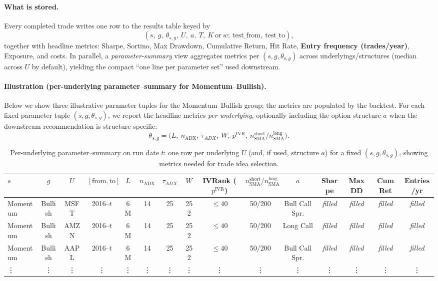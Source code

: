 \documentclass[12pt,a4paper]{report}
\begin{document}
\paragraph{What is stored.}
Every completed trade writes one row to the results table keyed by
\[
(s,\ g,\ \theta_{s,g},\ U,\ a,\ T,\ K\ \text{or}\ w;\ \text{test\_from},\ \text{test\_to}),
\]
together with headline metrics: Sharpe, Sortino, Max Drawdown, Cumulative Return, Hit Rate, \textbf{Entry frequency (trades/year)}, Exposure, and costs. In parallel, a \emph{parameter-summary} view aggregates metrics per $(s,g,\theta_{s,g})$ across underlyings/structures (median across $U$ by default), yielding the compact “one line per parameter set” used downstream.

\paragraph{Illustration (per-underlying parameter–summary for Momentum–Bullish).}
Below we show three illustrative parameter tuples for the Momentum–Bullish group; the metrics are populated by the backtest. For each fixed parameter tuple $(s,g,\theta_{s,g})$, we report the headline metrics \emph{per underlying}, optionally including the option structure $a$ when the downstream recommendation is structure-specific:
\[
\theta_{s,g}=\big(L,\ n_{\mathrm{ADX}},\ \tau_{\!ADX},\ W,\ p^{\text{IVR}},\ n_{\text{SMA}}^{\text{short}}/n_{\text{SMA}}^{\text{long}}\big).
\]

\begin{table}[h]
\centering
\begin{tabular}{lcccccccccccccc}
\toprule
$s$ & $g$ & $U$ & $[\text{from},\text{to}]$ & $L$ & $n_{\mathrm{ADX}}$ & $\tau_{\!ADX}$ & $W$ & IVRank ($p^{\text{IVR}}$) & $n_{\text{SMA}}^{\text{short}}/n_{\text{SMA}}^{\text{long}}$ & $a$ & Sharpe & MaxDD & CumRet & \textbf{Entries/yr} \\
\midrule
Momentum & Bullish & MSFT & 2016--$t$ & 6M  & 14 & 25 & 252 & $\le 40$ & 50/200 & Bull Call Spr. & \emph{filled} & \emph{filled} & \emph{filled} & \emph{filled} \\
Momentum & Bullish & AMZN & 2016--$t$ & 6M  & 14 & 25 & 252 & $\le 40$ & 50/200 & Long Call      & \emph{filled} & \emph{filled} & \emph{filled} & \emph{filled} \\
Momentum & Bullish & AAPL & 2016--$t$ & 6M  & 14 & 25 & 252 & $\le 40$ & 50/200 & Bull Call Spr. & \emph{filled} & \emph{filled} & \emph{filled} & \emph{filled} \\
\vdots    & \vdots  & \vdots & \vdots  & \vdots & \vdots & \vdots & \vdots & \vdots & \vdots & \vdots & \vdots & \vdots & \vdots & \vdots \\
\bottomrule
\end{tabular}
\caption{Per-underlying parameter–summary on run date $t$: one row per underlying $U$ (and, if used, structure $a$) for a fixed $(s,g,\theta_{s,g})$, showing metrics needed for trade idea selection.}
\label{tab:param-summary-mom-bull-perU}
\end{table}
\end{document}

